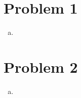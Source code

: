 \documentclass{article}
\begin{document}
\section*{Problem 1}
\textbf{}

\begin{enumerate}[(a), wide, labelwidth=!, labelindent=0pt]
    \item \textbf{}
\end{enumerate}

\newpage
\section*{Problem 2}

\textbf{}
\begin{enumerate}[(a), wide, labelwidth=!, labelindent=0pt]
    \item \textbf{}
\end{enumerate}
\end{document}
